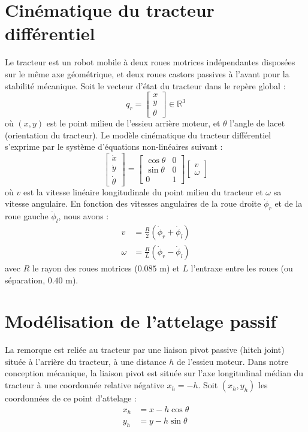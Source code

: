\documentclass[12pt,a4paper,openany]{report}
\begin{document}
\section{Cinématique du tracteur différentiel}
Le tracteur est un robot mobile à deux roues motrices indépendantes disposées sur le même axe géométrique, et deux roues castors passives à l'avant pour la stabilité mécanique. 
Soit le vecteur d'état du tracteur dans le repère global :
\begin{equation}
    q_r = \begin{bmatrix} x \\ y \\ \theta \end{bmatrix} \in \mathbb{R}^3
\end{equation}
où $(x, y)$ est le point milieu de l'essieu arrière moteur, et $\theta$ l'angle de lacet (orientation du tracteur).
Le modèle cinématique du tracteur différentiel s'exprime par le système d'équations non-linéaires suivant :
\begin{equation}
    \begin{bmatrix} \dot{x} \\ \dot{y} \\ \dot{\theta} \end{bmatrix} = \begin{bmatrix} \cos\theta & 0 \\ \sin\theta & 0 \\ 0 & 1 \end{bmatrix} \begin{bmatrix} v \\ \omega \end{bmatrix}
\end{equation}
où $v$ est la vitesse linéaire longitudinale du point milieu du tracteur et $\omega$ sa vitesse angulaire. En fonction des vitesses angulaires de la roue droite $\dot{\phi}_r$ et de la roue gauche $\dot{\phi}_l$, nous avons :
\begin{align}
    v &= \frac{R}{2} (\dot{\phi}_r + \dot{\phi}_l) \\
    \omega &= \frac{R}{L} (\dot{\phi}_r - \dot{\phi}_l)
\end{align}
avec $R$ le rayon des roues motrices ($0.085$ m) et $L$ l'entraxe entre les roues (ou séparation, $0.40$ m).

\section{Modélisation de l'attelage passif}
La remorque est reliée au tracteur par une liaison pivot passive (hitch joint) située à l'arrière du tracteur, à une distance $h$ de l'essieu moteur. Dans notre conception mécanique, la liaison pivot est située sur l'axe longitudinal médian du tracteur à une coordonnée relative négative $x_h = -h$.
Soit $(x_h, y_h)$ les coordonnées de ce point d'attelage :
\begin{align}
    x_h &= x - h \cos\theta \\
    y_h &= y - h \sin\theta
\end{align}
\end{document}
